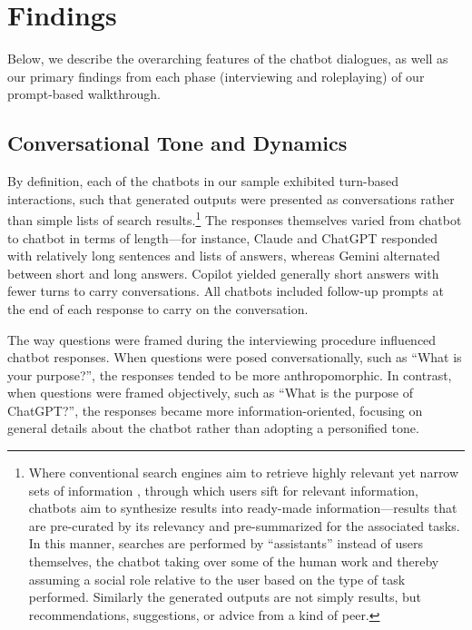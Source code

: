 \section{Findings}

Below, we describe the overarching features of the chatbot dialogues, as well as our primary findings from each phase (interviewing and roleplaying) of our prompt-based walkthrough.


\subsection{Conversational Tone and Dynamics}

By definition, each of the chatbots in our sample exhibited turn-based interactions, such that generated outputs were presented as conversations rather than simple lists of search results.\footnote{Where conventional search engines aim to retrieve highly relevant yet narrow sets of information \citep{shah2022situating}, through which users sift for relevant information, chatbots aim to synthesize results into ready-made information---results that are pre-curated by its relevancy and pre-summarized for the associated tasks. In this manner, searches are performed by ``assistants'' instead of users themselves, the chatbot taking over some of the human work and thereby assuming a social role relative to the user based on the type of task performed. Similarly the generated outputs are not simply results, but recommendations, suggestions, or advice from a kind of peer.} The responses themselves varied from chatbot to chatbot in terms of length---for instance, Claude and ChatGPT responded with relatively long sentences and lists of answers, whereas Gemini alternated between short and long answers. Copilot yielded generally short answers with fewer turns to carry conversations. All chatbots included follow-up prompts at the end of each response to carry on the conversation. 

The way questions were framed during the interviewing procedure influenced chatbot responses. When questions were posed conversationally, such as “What is your purpose?”, the responses tended to be more anthropomorphic. In contrast, when questions were framed objectively, such as “What is the purpose of ChatGPT?”, the responses became more information-oriented, focusing on general details about the chatbot rather than adopting a personified tone.


